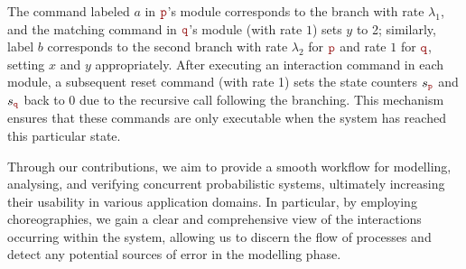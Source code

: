%
The command labeled \(a\) in \(\role{p}\)’s module corresponds to the
branch with rate \(\lambda_1\), and the matching command in
\(\role{q}\)’s module (with rate \(1\)) sets \(y\) to 2; similarly,
label \(b\) corresponds to the second branch with rate \(\lambda_2\)
for \(\role{p}\) and rate \(1\) for \(\role{q}\), setting \(x\) and
\(y\) appropriately.  After executing an interaction command in each
module, a subsequent reset command (with rate 1) sets the state
counters \( s_{\role p} \) and \( s_{\role q} \) back to 0 due to the
recursive call following the branching. This mechanism ensures that
these commands are only executable when the system has reached this
particular state.



Through our contributions, we aim to provide a smooth workflow for
modelling, analysing, and verifying concurrent probabilistic systems,
ultimately increasing their usability in various application domains.
In particular, by employing choreographies, we gain a clear and
comprehensive view of the interactions occurring within the system,
allowing us to discern the flow of processes and detect any potential
sources of error in the modelling phase.


